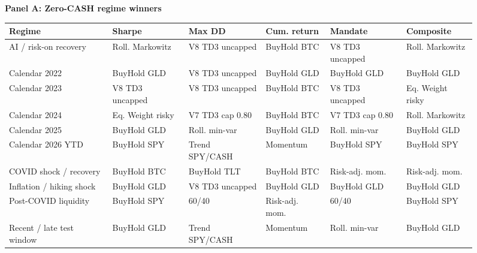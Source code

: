 \documentclass[11pt]{article}
\renewcommand{\arraystretch}{1.18}
\newcommand{\cashzero}{Zero-CASH}
\begin{document}
\begin{figure}[H]
\centering
\scriptsize
\setlength{\tabcolsep}{3pt}
\renewcommand{\arraystretch}{1.12}
\textbf{Panel A: \cashzero{} regime winners}\\[0.35em]
\begin{adjustbox}{max width=\textwidth}
\begin{tabular}{@{}L{0.22\textwidth} C{0.15\textwidth} C{0.15\textwidth} C{0.15\textwidth} C{0.15\textwidth} C{0.15\textwidth}@{}}
\toprule
Regime & Sharpe & Max DD & Cum. return & Mandate & Composite \\
\midrule
AI / risk-on recovery & Roll. Markowitz & V8 TD3 uncapped & BuyHold BTC & V8 TD3 uncapped & Roll. Markowitz \\
Calendar 2022 & BuyHold GLD & V8 TD3 uncapped & BuyHold GLD & BuyHold GLD & BuyHold GLD \\
Calendar 2023 & V8 TD3 uncapped & V8 TD3 uncapped & BuyHold BTC & V8 TD3 uncapped & Eq. Weight risky \\
Calendar 2024 & Eq. Weight risky & V7 TD3 cap 0.80 & BuyHold BTC & V7 TD3 cap 0.80 & Roll. Markowitz \\
Calendar 2025 & BuyHold GLD & Roll. min-var & BuyHold GLD & Roll. min-var & BuyHold GLD \\
Calendar 2026 YTD & BuyHold SPY & Trend SPY/CASH & Momentum & BuyHold SPY & BuyHold SPY \\
COVID shock / recovery & BuyHold BTC & BuyHold TLT & BuyHold BTC & Risk-adj. mom. & Risk-adj. mom. \\
Inflation / hiking shock & BuyHold GLD & V8 TD3 uncapped & BuyHold GLD & BuyHold GLD & BuyHold GLD \\
Post-COVID liquidity & BuyHold SPY & 60/40 & Risk-adj. mom. & 60/40 & BuyHold SPY \\
Recent / late test window & BuyHold GLD & Trend SPY/CASH & Momentum & Roll. min-var & BuyHold GLD \\
\bottomrule
\end{tabular}
\end{adjustbox}


\end{figure}
\end{document}
